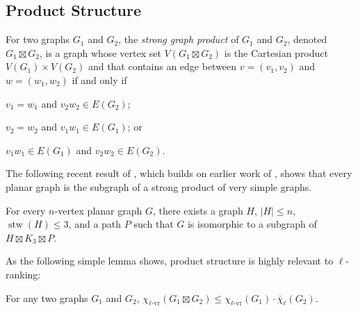 \documentclass[kpfonts]{patmorin}
\newcommand{\defin}[1]{\emph{\color{brightmaroon}#1}}
\DeclareMathOperator{\stw}{stw}
\newcommand{\rn}[1]{\chi_{\operatorname{#1-vr}}}
\newcommand{\lrn}{\rn{\ell}}
\newcommand{\dlcn}{\bar{\chi}_\ell}
\theoremstyle{named}
\begin{document}
\subsection{Product Structure}

For two graphs $G_1$ and $G_2$, the \defin{strong graph product} of $G_1$ and $G_2$, denoted $G_1\boxtimes G_2$, is a graph whose vertex set $V(G_1\boxtimes G_2)$ is the Cartesian product $V(G_1)\times V(G_2)$ and that contains an edge between $v=(v_1,v_2)$ and $w=(w_1,w_2)$ if and only if
\begin{inparaenum}[(i)]
    \item $v_1=w_1$ and $v_2w_2\in E(G_2)$;
    \item $v_2=w_2$ and $v_1w_1\in E(G_1)$; or
    \item $v_1w_1\in E(G_1)$ and $v_2w_2\in E(G_2)$.
\end{inparaenum}

The following recent result of \citet{dujmovic.joret.ea:planar}, which builds on earlier work of \citet{pilipczuk.siebertz:polynomial}, shows that every planar graph is the subgraph of a strong product of very simple graphs.

\begin{thm}\label{product-structure}
    For every $n$-vertex planar graph $G$, there exists a graph $H$, $|H|\le n$, $\stw(H)\le 3$, and a path $P$ such that $G$ is isomorphic to a subgraph of $H\boxtimes K_3\boxtimes P$.
\end{thm}

As the following simple lemma shows, product structure is highly relevant to $\ell$-ranking:

\begin{lem}\label{product-lemma}
    For any two graphs $G_1$ and $G_2$, $\lrn(G_1\boxtimes G_2)\le \lrn(G_1)\cdot\dlcn(G_2)$.
\end{lem}
\end{document}
